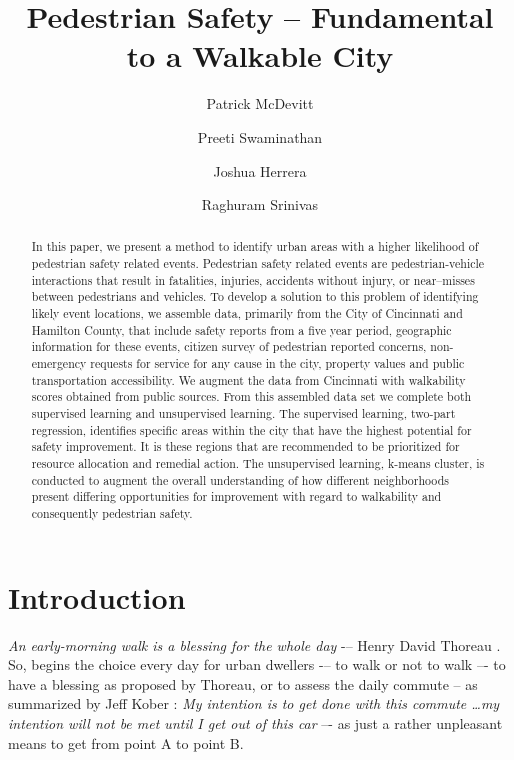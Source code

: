 \documentclass{llncs}
\begin{document}
\setlength{\parskip}{0pt}
%
%
\title{Pedestrian Safety -- Fundamental to a Walkable City}
%
\author{Patrick McDevitt \and Preeti Swaminathan
\and Joshua Herrera \and Raghuram Srinivas}
%

\maketitle              %

\begin{abstract}
In this paper, we present a method to identify urban areas with a higher likelihood of pedestrian safety related events. Pedestrian safety related events are pedestrian-vehicle interactions that result in fatalities, injuries, accidents without injury, or near--misses between pedestrians and vehicles. To develop a solution to this problem of identifying likely event locations, we assemble data, primarily from the City of Cincinnati and Hamilton County, that include safety reports from a five year period, geographic information for these events, citizen survey of pedestrian reported concerns, non-emergency requests for service for any cause in the city, property values and public transportation accessibility. We augment the data from Cincinnati with walkability scores obtained from public sources. From this assembled data set we complete both supervised learning and unsupervised learning. The supervised learning, two-part regression, identifies specific areas within the city that have the highest potential for safety improvement. It is these regions that are recommended to be prioritized for resource allocation and remedial action. The unsupervised learning, k-means cluster, is conducted to augment the overall understanding of how different neighborhoods present differing opportunities for improvement with regard to walkability and consequently pedestrian safety.
\end{abstract}
%
\section{Introduction}
%
\emph{An early-morning walk is a blessing for the whole day} -– Henry David Thoreau \cite{thoreau1906writings}. So, begins the choice every day for urban dwellers -– to walk or not to walk –- to have a blessing as proposed by Thoreau, or to assess the daily commute -- as summarized by Jeff Kober \cite{bowen2015zen}: \emph{My intention is to get done with this commute \dots my intention will not be met until I get out of this car} –- as just a rather unpleasant means to get from point A to point B.
\end{document}

